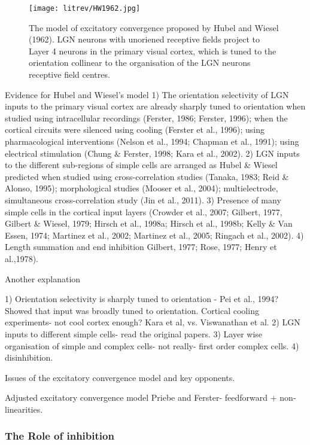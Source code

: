 	\begin{figure}[H]
	
	\texttt{[image: litrev/HW1962.jpg]}
	\caption{The model of excitatory convergence proposed by Hubel and Wiesel (1962). LGN neurons with unoriened receptive fields project to Layer 4 neurons in the primary visual cortex, which is tuned to the orientation collinear to the organisation of the LGN neurons receptive field centres.}
	\label{fig:HW}
	\end{figure}

Evidence for Hubel and Wiesel's model
1) The orientation selectivity of LGN inputs to the primary visual cortex are already sharply tuned to orientation when studied using intracellular recordings (Ferster, 1986; Ferster, 1996); when the cortical circuits were silenced using cooling (Ferster et al., 1996); using pharmacological interventions (Nelson et al., 1994; Chapman et al., 1991); using electrical stimulation (Chung \& Ferster, 1998; Kara et al., 2002).
2) LGN inputs to the different sub-regions of simple cells are arranged as Hubel \& Wiesel predicted when studied using cross-correlation studies (Tanaka, 1983; Reid \& Alonso, 1995); morphological studies (Mooser et al., 2004); multielectrode, simultaneous cross-correlation study (Jin et al., 2011).
3) Presence of many simple cells in the cortical input layers (Crowder et al., 2007; Gilbert, 1977, Gilbert \& Wiesel, 1979; Hirsch et al., 1998a; Hirsch et al., 1998b; Kelly \& Van Essen, 1974; Martinez et al., 2002; Martinez et al., 2005; Ringach et al., 2002).
4) Length summation and end inhibition Gilbert, 1977; Rose, 1977; Henry et al.,1978).

Another explanation

1) Orientation selectivity is sharply tuned to orientation - Pei et al., 1994? Showed that input was broadly tuned to orientation. Cortical cooling experiments- not cool cortex enough? Kara et al, vs. Viswanathan et al.
2) LGN inputs to different simple cells- read the original papers.
3) Layer wise organisation of simple and complex cells- not really- first order complex cells.
4) disinhibition.

Issues of the excitatory convergence model and key opponents.

Adjusted excitatory convergence model
Priebe and Ferster- feedforward + non-linearities.

\subsubsection{The Role of inhibition}

